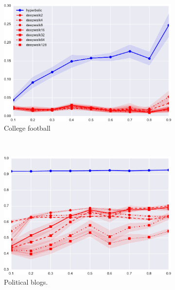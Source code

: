 \documentclass[sigconf, review]{acmart}
\begin{document}
\begin{figure}[h!]
    \centering
    \begin{subfigure}[t]{0.7\textwidth}
    \centering
    \includegraphics[width=\hsize]{football}
    \caption{College football}
    \label{fig:football}
    \end{subfigure}
    \\ 
    \begin{subfigure}[t]{0.4\textwidth}
        \centering
        \includegraphics[width=\hsize]{political_blogs}
        \caption{Political blogs.}
    \end{subfigure}%
   \hfill
    \begin{subfigure}[t]{0.4\textwidth}
        \centering

\end{subfigure}
\end{figure}
\end{document}
